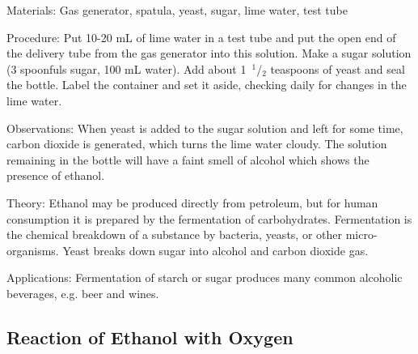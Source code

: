 \begin{multicols}{2}

\begin{description*}
\item[Materials:]{Gas generator, spatula, yeast, sugar, lime water, test tube}
\item[Procedure:]{Put 10-20 mL of lime water in a test tube and put the open end of the delivery tube from the gas generator into this solution. Make a sugar solution (3 spoonfuls sugar, 100 mL water). Add about 1~$^1$/$_2$ teaspoons of yeast and seal the bottle. Label the container and set it aside, checking daily for changes in the lime water.}
\item[Observations:]{When yeast is added to the sugar solution and left for some time, carbon dioxide is generated, which turns the lime water cloudy. The solution remaining in the bottle will have a faint smell of alcohol which shows the presence of ethanol.}
\item[Theory:]{Ethanol may be produced directly from petroleum, but for human consumption it is prepared by the fermentation of carbohydrates. Fermentation is the chemical breakdown of a substance by bacteria, yeasts, or other micro-organisms. Yeast breaks down sugar into alcohol and carbon dioxide gas.}
\item[Applications:]{Fermentation of starch or sugar produces many common alcoholic beverages, e.g. beer and wines.}
\end{description*}

\vfill
\columnbreak

\subsection{Reaction of Ethanol with Oxygen}



\end{multicols}

